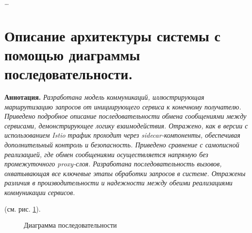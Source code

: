 \dots



\section{Описание архитектуры системы с помощью диаграммы последовательности.}

\textbf{Аннотация.} \textit{Разработана модель коммуникаций, иллюстрирующая маршрутизацию запросов от инициирующего сервиса к конечному получателю. Приведено подробное описание последовательности обмена сообщениями между сервисами, демонстрирующее логику взаимодействия. Отражено, как в версии с использованием Istio трафик проходит через sidecar-компоненты, обеспечивая дополнительный контроль и безопасность. Приведено сравнение с самописной реализацией, где обмен сообщениями осуществляется напрямую без промежуточного proxy-слоя. Разработана последовательность вызовов, охватывающая все ключевые этапы обработки запросов в системе. Отражены различия в производительности и надежности между обеими реализациями коммуникации сервисов.}

(см. рис. \ref{pic:sequence-diagram}).

\begin{figure}[t]
    \centering
    \caption{Диаграмма последовательности}
    \label{pic:sequence-diagram}
  \end{figure}
  




